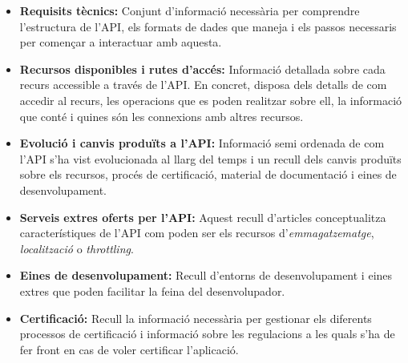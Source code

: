     \begin{itemize}
        \item \textbf{Requisits tècnics:} Conjunt d’informació necessària per comprendre l’estructura de l'\gls{API}, els formats de dades que maneja i els passos necessaris per començar a interactuar amb aquesta.
        \item \textbf{Recursos disponibles i rutes d’accés:} Informació detallada sobre cada recurs accessible a través de l'\gls{API}. En concret, disposa dels detalls de com accedir al recurs, les operacions que es poden realitzar sobre ell, la informació que conté i quines són les connexions amb altres recursos.
        \item \textbf{Evolució i canvis produïts a l'\gls{API}:} Informació semi ordenada de com l'\gls{API} s’ha vist evolucionada al llarg del temps i un recull dels canvis produïts sobre els recursos, procés de certificació, material de documentació i eines de desenvolupament.
        \item \textbf{Serveis extres oferts per l'\gls{API}:} Aquest recull d’articles conceptualitza ca\-rac\-te\-rís\-ti\-ques de l'\gls{API} com poden ser els recursos d'\emph{emmagatzematge}, \emph{lo\-ca\-lit\-za\-ció} o \emph{throttling}.
        \item \textbf{Eines de desenvolupament:} Recull d’entorns de desenvolupament i eines extres que poden facilitar la feina del desenvolupador.
        \item \textbf{Certificació:} Recull la informació necessària per gestionar els diferents processos de certificació i informació sobre les regulacions a les quals s'ha de fer front en cas de voler certificar l'aplicació.
    \end{itemize}
